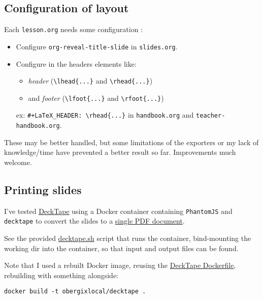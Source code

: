 \documentclass[a4paper]{article}
\newenvironment{NOTES}{\begin{lrbox}{\mybox}\begin{minipage}{0.9\textwidth}\begin{shaded}}{\end{shaded}\end{minipage}\end{lrbox}\fbox{\usebox{\mybox}}}
\begin{document}
\subsection{Configuration of layout}
\label{sec:orgd2c7642}

Each \texttt{lesson.org} needs some configuration :
\begin{itemize}
\item Configure \texttt{org-reveal-title-slide} in \texttt{slides.org}.

\item Configure in the headers elements like:
\begin{itemize}
\item \emph{header} (\texttt{\textbackslash{}lhead\{...\}} and \texttt{\textbackslash{}rhead\{...\}})
\item and \emph{footer} (\texttt{\textbackslash{}lfoot\{...\}} and \texttt{\textbackslash{}rfoot\{...\}})
\end{itemize}

ex: \texttt{\#+LaTeX\_HEADER: \textbackslash{}rhead\{...\}} in \texttt{handbook.org} and
  \texttt{teacher-handbook.org}.
\end{itemize}

\begin{NOTES}
These may be better handled, but some limitations of the exporters or
my lack of knowledge/time have prevented a better result so
far. Improvements much welcome.
\end{NOTES}


\subsection{Printing slides}
\label{sec:org3d520e1}

I've tested \href{https://github.com/astefanutti/decktape}{DeckTape} using a Docker container containing \texttt{PhantomJS} and
\texttt{decktape} to convert the slides to a \href{slides.pdf}{single PDF document}.

See the provided \href{bin/decktape.sh}{decktape.sh} script that runs the container, bind-mounting the
working dir into the container, so that input and output files can be
found.

Note that I used a rebuilt Docker image, reusing the \href{https://raw.githubusercontent.com/astefanutti/decktape/master/Dockerfile}{DeckTape
Dockerfile}, rebuilding with something alongside:
\begin{verbatim}
docker build -t obergixlocal/decktape .
\end{verbatim}
\end{document}
